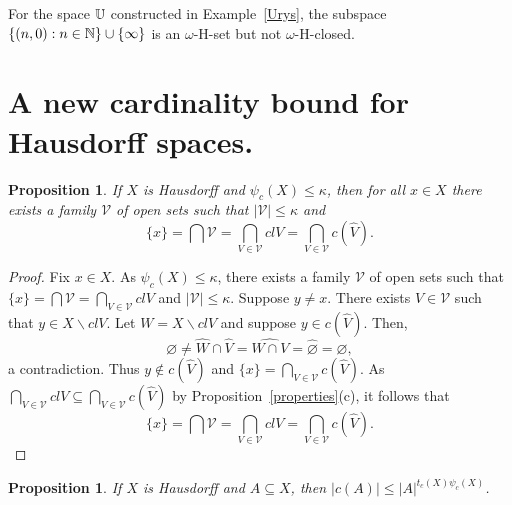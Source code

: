 \documentclass[11pt]{amsart}
\newif\ifdraft\draftfalse
\newtheorem{proposition}[theorem]{Proposition}
\theoremstyle{definition}
\theoremstyle{remark}
\numberwithin{equation}{section}
\begin{document}
For the space $\Bbb U$ constructed in Example~\ref{Urys}, the subspace $\{(n,0): n \in \Bbb N\} \cup \{\infty\}$ is an $\omega$-H-set but not $\omega$-H-closed.

\section{A new cardinality bound for Hausdorff spaces.}

\begin{proposition}{{\immediate{}}{\ifdraft\hspace{-\lastskip}\vadjust{\vspace{-1mm}\smash{\llap{{\tt {{intersection}}}\hspace{8mm}}}\vspace{1mm}}\fi}}
If $X$ is Hausdorff and $\psi_c(X)\leq\kappa$, then for all $x\in X$ there exists a family ${\ensuremath{\mathcal{{V}}}}$ of open sets such that $|{\ensuremath{\mathcal{{V}}}}|\leq\kappa$ and 
$$\{x\}={\bigcap}{\ensuremath{\mathcal{{V}}}}={\bigcap}_{V\in{\ensuremath{\mathcal{{V}}}}}clV={\bigcap}_{V\in{\ensuremath{\mathcal{{V}}}}}c(\widehat{V}).$$
\end{proposition}

\begin{proof}
Fix $x\in X$. As $\psi_c(X)\leq\kappa$, there exists a family ${\ensuremath{\mathcal{{V}}}}$ of open sets such that $\{x\}={\bigcap}{\ensuremath{\mathcal{{V}}}}={\bigcap}_{V\in{\ensuremath{\mathcal{{V}}}}}clV$ and $|{\ensuremath{\mathcal{{V}}}}|\leq\kappa$. Suppose $y\neq x$. There exists $V\in{\ensuremath{\mathcal{{V}}}}$ such that $y\in X{\backslash} clV$. Let $W=X{\backslash} clV$ and suppose $y\in c(\widehat{V})$. Then, 
$${\varnothing}\neq\widehat{W}{\cap}\widehat{V}=\widehat{W{\cap} V}=\widehat{\varnothing}={\varnothing},$$
a contradiction. Thus $y\notin c(\widehat{V})$ and $\{x\}={\bigcap}_{V\in{\ensuremath{\mathcal{{V}}}}}c(\widehat{V})$. As ${\bigcap}_{V\in{\ensuremath{\mathcal{{V}}}}}clV{\subseteq}{\bigcap}_{V\in{\ensuremath{\mathcal{{V}}}}}c(\widehat{V})$ by Proposition~\ref{properties}(c), it follows that
$$\{x\}={\bigcap}{\ensuremath{\mathcal{{V}}}}={\bigcap}_{V\in{\ensuremath{\mathcal{{V}}}}}clV={\bigcap}_{V\in{\ensuremath{\mathcal{{V}}}}}c(\widehat{V}).$$
\end{proof}

\begin{proposition}{{\immediate{}}{\ifdraft\hspace{-\lastskip}\vadjust{\vspace{-1mm}\smash{\llap{{\tt {{cbound}}}\hspace{8mm}}}\vspace{1mm}}\fi}}
If $X$ is Hausdorff and $A{\subseteq} X$, then $|c(A)|\leq |A|^{t_c(X)\psi_c(X)}$.
\end{proposition}
\end{document}
